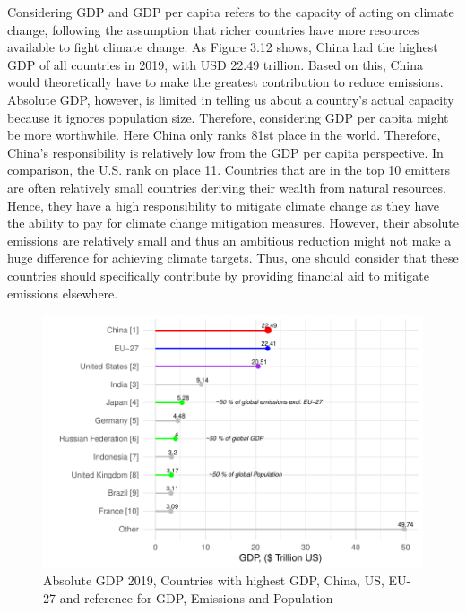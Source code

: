 \documentclass[
  12pt,
]{article}
\numberwithin{equation}{section}
\numberwithin{table}{section}
\numberwithin{figure}{section}
\begin{document}
Considering GDP and GDP per capita refers to the capacity of acting on
climate change, following the assumption that richer countries have more
resources available to fight climate change. As Figure 3.12 shows, China
had the highest GDP of all countries in 2019, with USD 22.49 trillion.
Based on this, China would theoretically have to make the greatest
contribution to reduce emissions. Absolute GDP, however, is limited in
telling us about a country's actual capacity because it ignores
population size. Therefore, considering GDP per capita might be more
worthwhile. Here China only ranks 81st place in the world. Therefore,
China's responsibility is relatively low from the GDP per capita
perspective. In comparison, the U.S. rank on place 11. Countries that
are in the top 10 emitters are often relatively small countries deriving
their wealth from natural resources. Hence, they have a high
responsibility to mitigate climate change as they have the ability to
pay for climate change mitigation measures. However, their absolute
emissions are relatively small and thus an ambitious reduction might not
make a huge difference for achieving climate targets. Thus, one should
consider that these countries should specifically contribute by
providing financial aid to mitigate emissions elsewhere.

\begin{figure}
\centering
\includegraphics{Paper_files/figure-latex/unnamed-chunk-15-1.pdf}
\caption{Absolute GDP 2019, Countries with highest GDP, China, US, EU-27
and reference for GDP, Emissions and Population}
\end{figure}
\end{document}
